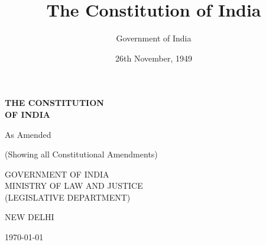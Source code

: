 \documentclass[a4paper,12pt,showamendments,twoside]{soi}
\title{The Constitution of India}
\author{Government of India}
\date{26th November, 1949}
\begin{document}
\frontmatter
{}

\begin{titlepage}
    \centering
    \vspace*{2cm}
    
    {\Huge\bfseries THE CONSTITUTION\\[0.5cm]OF INDIA}
    
    \vspace{2cm}
    
    {\Large As Amended}
    
    \vspace{1cm}
    
    {\large (Showing all Constitutional Amendments)}
    
    \vspace{3cm}
    
    
    \vfill
    
    {\large GOVERNMENT OF INDIA\\
    MINISTRY OF LAW AND JUSTICE\\
    (LEGISLATIVE DEPARTMENT)}
    
    \vspace{1cm}
    
    {\large NEW DELHI}
    
    \vspace{0.5cm}
    
    {\normalsize \today}
\end{titlepage}

\tableofcontents
\cleardoublepage



\mainmatter
{}

\ifcompilepart
    
    
    
    
    
    
\end{document}
